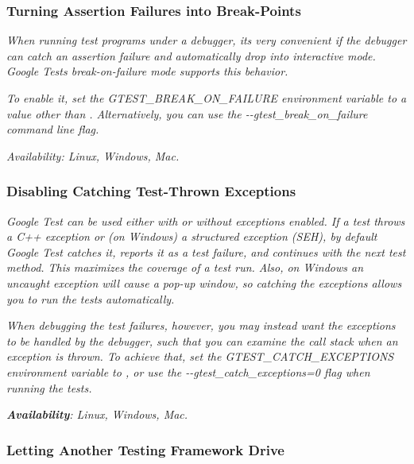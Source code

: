{\itshape }

{\itshape \subsubsection*{Turning Assertion Failures into Break-\/\+Points}}

{\itshape }

{\itshape When running test programs under a debugger, it\textquotesingle{}s very convenient if the debugger can catch an assertion failure and automatically drop into interactive mode. Google Test\textquotesingle{}s {\itshape break-\/on-\/failure} mode supports this behavior.}

{\itshape To enable it, set the {\ttfamily G\+T\+E\+S\+T\+\_\+\+B\+R\+E\+A\+K\+\_\+\+O\+N\+\_\+\+F\+A\+I\+L\+U\+RE} environment variable to a value other than {} . Alternatively, you can use the {\ttfamily -\/-\/gtest\+\_\+break\+\_\+on\+\_\+failure} command line flag.}

{\itshape {\itshape Availability\+:} Linux, Windows, Mac.}

{\itshape \subsubsection*{Disabling Catching Test-\/\+Thrown Exceptions}}

{\itshape }

{\itshape Google Test can be used either with or without exceptions enabled. If a test throws a C++ exception or (on Windows) a structured exception (S\+EH), by default Google Test catches it, reports it as a test failure, and continues with the next test method. This maximizes the coverage of a test run. Also, on Windows an uncaught exception will cause a pop-\/up window, so catching the exceptions allows you to run the tests automatically.}

{\itshape When debugging the test failures, however, you may instead want the exceptions to be handled by the debugger, such that you can examine the call stack when an exception is thrown. To achieve that, set the {\ttfamily G\+T\+E\+S\+T\+\_\+\+C\+A\+T\+C\+H\+\_\+\+E\+X\+C\+E\+P\+T\+I\+O\+NS} environment variable to {}, or use the {\ttfamily -\/-\/gtest\+\_\+catch\+\_\+exceptions=0} flag when running the tests.}

{\itshape {\bfseries{Availability}}\+: Linux, Windows, Mac.}

{\itshape \subsubsection*{Letting Another Testing Framework Drive}}

